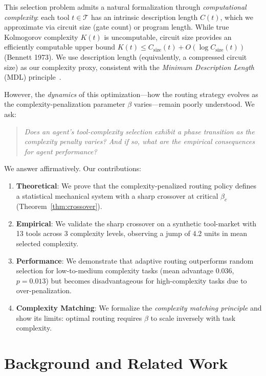 \documentclass[12pt]{article}
\theoremstyle{definition}
\begin{document}
This selection problem admits a natural formalization through \emph{computational complexity}: each tool $t \in \mathcal{T}$ has an intrinsic description length $C(t)$, which we approximate via circuit size (gate count) or program length. While true Kolmogorov complexity $K(t)$ is uncomputable, circuit size provides an efficiently computable upper bound $K(t) \leq C_{\mathrm{size}}(t) + O(\log C_{\mathrm{size}}(t))$ (Bennett 1973). We use description length (equivalently, a compressed circuit size) as our complexity proxy, consistent with the \emph{Minimum Description Length} (MDL) principle~\cite{r89-grunwald2007-mdl, r90-pedersen2015-mdl}.

However, the \emph{dynamics} of this optimization---how the routing strategy evolves as the complexity-penalization parameter $\beta$ varies---remain poorly understood. We ask:

\begin{quote}
\textit{Does an agent's tool-complexity selection exhibit a phase transition as the complexity penalty varies? And if so, what are the empirical consequences for agent performance?}
\end{quote}

We answer affirmatively. Our contributions:

\begin{enumerate}
  \item \textbf{Theoretical}: We prove that the complexity-penalized routing policy defines a statistical mechanical system with a sharp crossover at critical $\beta_c$ (Theorem~\ref{thm:crossover}).
  \item \textbf{Empirical}: We validate the sharp crossover on a synthetic tool-market with 13 tools across 3 complexity levels, observing a jump of 4.2 units in mean selected complexity.
  \item \textbf{Performance}: We demonstrate that adaptive routing outperforms random selection for low-to-medium complexity tasks (mean advantage 0.036, $p=0.013$) but becomes disadvantageous for high-complexity tasks due to over-penalization.
  \item \textbf{Complexity Matching}: We formalize the \emph{complexity matching principle} and show its limits: optimal routing requires $\beta$ to scale inversely with task complexity.
\end{enumerate}

\section{Background and Related Work}
\end{document}
